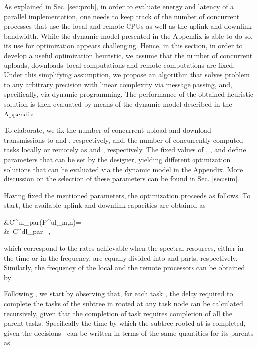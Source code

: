 \documentclass[journal,twocolumn,10pt,twoside]{IEEEtranTCOM}
\theoremstyle{plain}
\theoremstyle{plain}
\theoremstyle{remark}
\begin{document}
As explained in Sec. \ref{sec:prob}, in order to evaluate energy and latency of a parallel implementation, one needs to keep track of the number of concurrent processes that use the local and remote CPUs as well as the uplink and downlink bandwidth. While the dynamic model presented in the Appendix is able to do so, its use for optimization appears challenging. Hence, in this section, in order to develop a useful optimization heuristic, we assume that the number of concurrent uploads, downloads, local computations and remote computations are fixed. Under this simplifying assumption, we propose an algorithm that solves problem  to any arbitrary precision with linear complexity via message passing, and, specifically, via dynamic programming. The performance of the obtained heuristic solution is then evaluated by means of the dynamic model described in the Appendix.

To elaborate, we fix the number of concurrent upload and download transmissions to  and , respectively, and, the number of concurrently computed tasks locally or remotely as  and , respectively. The fixed values of , ,  and  define parameters that can be set by the designer, yielding different optimization solutions that can be evaluated via the dynamic model in the Appendix. More discussion on the selection of these parameters can be found in Sec. \ref{sec:sim}.

Having fixed the mentioned parameters, the optimization proceeds as follows. To start, the available uplink and downlink capacities are obtained as
 
&C^{ul}_{par}(P^{ul}_{m,n})=\\
&~C^{dl}_{par}=,

which correspond to the rates achievable when the spectral resources, either in the time or in the frequency, are equally divided into  and  parts, respectively. Similarly, the frequency of the local and the remote processors can be obtained by



Following \cite{no}, we start by observing that, for each task , the delay required to complete the tasks of the subtree in  rooted at any task node  can be calculated recursively, given that the completion of task  requires completion of all the parent tasks. Specifically the time  by which the subtree rooted at  is completed, given the decisions , can be written in terms of the same quantities for its parents as
\end{document}
